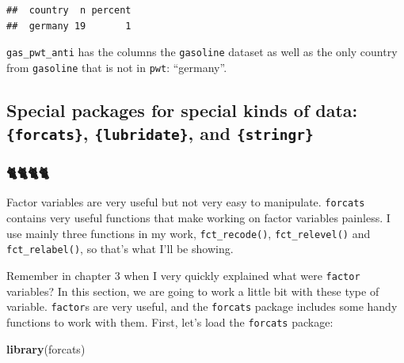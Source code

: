 \documentclass[]{gitbook}
\newenvironment{Shaded}{\begin{snugshade}}{\end{snugshade}}
\newcommand{\KeywordTok}[1]{\textcolor[rgb]{0.13,0.29,0.53}{\textbf{#1}}}
\newcommand{\NormalTok}[1]{#1}
\newcommand{\OperatorTok}[1]{\textcolor[rgb]{0.81,0.36,0.00}{\textbf{#1}}}
\newcommand{\StringTok}[1]{\textcolor[rgb]{0.31,0.60,0.02}{#1}}
\theoremstyle{definition}
\theoremstyle{definition}
\theoremstyle{definition}
\theoremstyle{remark}
\begin{document}
\begin{Shaded}
\end{Shaded}

\begin{verbatim}
##  country  n percent
##  germany 19       1
\end{verbatim}

\texttt{gas\_pwt\_anti} has the columns the \texttt{gasoline} dataset as
well as the only country from \texttt{gasoline} that is not in
\texttt{pwt}: ``germany''.

\hypertarget{special-packages-for-special-kinds-of-data-forcats-lubridate-and-stringr}{%
\subsection{\texorpdfstring{Special packages for special kinds of data:
\texttt{\{forcats\}}, \texttt{\{lubridate\}}, and
\texttt{\{stringr\}}}{Special packages for special kinds of data: \{forcats\}, \{lubridate\}, and \{stringr\}}}\label{special-packages-for-special-kinds-of-data-forcats-lubridate-and-stringr}}

\hypertarget{section}{%
\subsubsection{🐈🐈🐈🐈}\label{section}}

Factor variables are very useful but not very easy to manipulate.
\texttt{forcats} contains very useful functions that make working on
factor variables painless. I use mainly three functions in my work,
\texttt{fct\_recode()}, \texttt{fct\_relevel()} and
\texttt{fct\_relabel()}, so that's what I'll be showing.

Remember in chapter 3 when I very quickly explained what were
\texttt{factor} variables? In this section, we are going to work a
little bit with these type of variable. \texttt{factor}s are very
useful, and the \texttt{forcats} package includes some handy functions
to work with them. First, let's load the \texttt{forcats} package:

\begin{Shaded}
\begin{Highlighting}[]
\KeywordTok{library}\NormalTok{(forcats)}
\end{Highlighting}
\end{Shaded}
\end{document}
